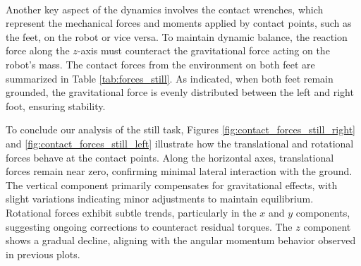 \documentclass[main.tex]{subfiles}
\begin{document}
\begin{sloppypar}
\begin{figure}[htbp]
    \label{fig:comparison_still}
\end{figure}
\\
Another key aspect of the dynamics involves the contact wrenches, which represent the mechanical forces and moments applied by contact points, such as the feet, on the robot or vice versa. To maintain dynamic balance, the reaction force along the $z$-axis must counteract the gravitational force acting on the robot’s mass. The contact forces from the environment on both feet are summarized in Table \ref{tab:forces_still}. As indicated, when both feet remain grounded, the gravitational force is evenly distributed between the left and right foot, ensuring stability.
\begin{table}[H]
    \centering
    \renewcommand{\arraystretch}{1.2}
    \caption{Summary of Forces and Foot Positions per Interval - Still Task}
    \label{tab:forces_still}
\end{table}
To conclude our analysis of the still task, Figures \ref{fig:contact_forces_still_right} and \ref{fig:contact_forces_still_left} illustrate how the translational and rotational forces behave at the contact points. Along the horizontal axes, translational forces remain near zero, confirming minimal lateral interaction with the ground. The vertical component primarily compensates for gravitational effects, with slight variations indicating minor adjustments to maintain equilibrium. Rotational forces exhibit subtle trends, particularly in the \( x \) and \( y \) components, suggesting ongoing corrections to counteract residual torques. The \( z \) component shows a gradual decline, aligning with the angular momentum behavior observed in previous plots.
\begin{figure}[htbp]

\end{figure}
\end{sloppypar}
\end{document}
